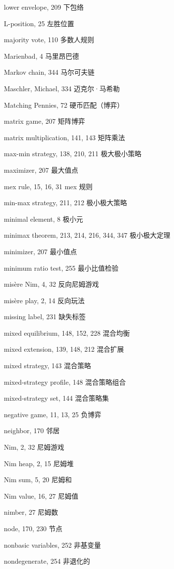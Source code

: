 lower envelope, 209 下包络 

L-position, 25 {\color{blue}左胜位置} 

majority vote, 110 {\color{blue}多数人规则} 

Marienbad, 4 马里昂巴德 

Markov chain, 344 马尔可夫链 

Maschler, Michael, 334 迈克尔·马希勒 

Matching Pennies, 72 硬币匹配（博弈） 

matrix game, 207 矩阵博弈 

matrix multiplication, 141, 143 矩阵乘法 

max-min strategy, 138, 210, 211 极大极小策略 

maximizer, 207 {\color{blue}最大值点} 

mex rule, 15, 16, 31 mex 规则 

min-max strategy, 211, 212 极小极大策略 

minimal element, 8 极小元 

minimax theorem, 213, 214, 216, 344, 347 极小极大定理 

minimizer, 207 {\color{blue}最小值点} 

minimum ratio test, 255 最小比值检验 

misère Nim, 4, 32 {\color{blue}反向尼姆游戏} 

misère play, 2, 14 {\color{blue}反向玩法} 

missing label, 231 缺失标签 

mixed equilibrium, 148, 152, 228 混合均衡 

mixed extension, 139, 148, 212 混合扩展 

mixed strategy, 143 混合策略 

mixed-strategy profile, 148 混合策略组合 

mixed-strategy set, 144 混合策略集 

negative game, 11, 13, 25 负博弈 

neighbor, 170 邻居 

Nim, 2, 32 尼姆游戏

Nim heap, 2, 15 尼姆堆 

Nim sum, 5, 20 尼姆和 

Nim value, 16, 27 尼姆值 

nimber, 27 尼姆数 

node, 170, 230 节点 

nonbasic variables, 252 非基变量

nondegenerate, 254 非退化的 

